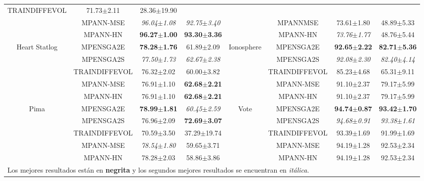 \begin{landscape}
\begin{longtable}{cccccccc}
TRAINDIFFEVOL & 71.73$\pm$2.11 & 28.36$\pm$19.90 \\
\rowcolor[rgb]{0.86,0.94,1}& MPANN-MSE & \textit{96.04$\pm$1.08} & \textit{92.75$\pm$3.40}
&  & MPANNMSE & 73.61$\pm$1.80 & 48.89$\pm$5.33\textbf{} \\
\rowcolor[rgb]{0.86,0.94,1}& MPANN-HN & \textbf{96.27$\pm$1.00} & \textbf{93.30$\pm$3.36}
&  & MPANN-HN & \textit{73.76$\pm$1.77} & 48.76$\pm$5.44\textbf{} \\ \hline
\rowcolor[rgb]{0.86,0.94,1}Heart Statlog & MPENSGA2E & \textbf{78.28$\pm$1.76} &
61.89$\pm$2.09 & Ionosphere & MPENSGA2E & \textbf{92.65$\pm$2.22} &
\textbf{82.71$\pm$5.36} \\
\rowcolor[rgb]{0.86,0.94,1}& MPENSGA2S & \textit{77.50$\pm$1.73} & \textit{62.67$\pm$2.38}
&  & MPENSGA2S & \textit{92.08$\pm$2.30} & \textit{82.40$\pm$4.14} \\
\rowcolor[rgb]{0.86,0.94,1}& TRAINDIFFEVOL & 76.32$\pm$2.02 & 60.00$\pm$3.82 &  &
TRAINDIFFEVOL & 85.23$\pm$4.68 & 65.31$\pm$9.11 \\
\rowcolor[rgb]{0.86,0.94,1}& MPANN-MSE & 76.91$\pm$1.10 & \textbf{62.68$\pm$2.21} &  &
MPANN-MSE & 91.10$\pm$2.37 & 79.17$\pm$5.99 \\
\rowcolor[rgb]{0.86,0.94,1}& MPANN-HN & 76.91$\pm$1.10 & \textbf{62.68$\pm$2.21} &  &
MPANN-HN & 91.10$\pm$2.37 & 79.17$\pm$5.99 \\ \hline
\rowcolor[rgb]{0.86,0.94,1}Pima & MPENSGA2E & \textbf{78.99$\pm$1.81} &
\textit{60.45$\pm$2.59} & Vote & MPENSGA2E & \textbf{94.74$\pm$0.87} &
\textbf{93.42$\pm$1.70} \\
\rowcolor[rgb]{0.86,0.94,1}& MPENSGA2S & 76.96$\pm$2.09\textbf{} & \textbf{72.69$\pm$3.07}
&  & MPENSGA2S & \textit{94.68$\pm$0.91} & \textit{93.38$\pm$1.61}\textbf{\textit{}} \\
\rowcolor[rgb]{0.86,0.94,1}& TRAINDIFFEVOL & 70.59$\pm$3.50 & 37.29$\pm$19.74 &  &
TRAINDIFFEVOL & 93.39$\pm$1.69 & 91.99$\pm$1.69 \\
\rowcolor[rgb]{0.86,0.94,1}& MPANN-MSE & \textit{78.54$\pm$1.80} & 59.65$\pm$3.71 &  &
MPANN-MSE & 94.19$\pm$1.28 & 92.53$\pm$2.34 \\
\rowcolor[rgb]{0.86,0.94,1}& MPANN-HN & 78.28$\pm$2.03 & 58.86$\pm$3.86 &  & MPANN-HN &
94.19$\pm$1.28 & 92.53$\pm$2.34 \\ \hline
\multicolumn{8}{l}{Los mejores resultados están en \textbf{negrita} y los segundos mejores
resultados se encuentran en \textit{itálica}.} \\
\end{longtable}
\end{landscape}

